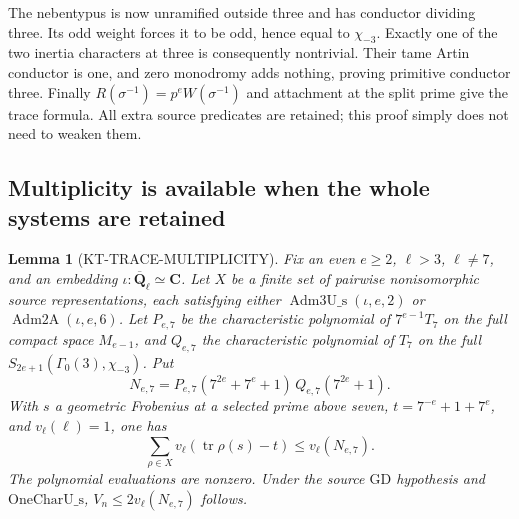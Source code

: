 \documentclass[11pt,a4paper]{article}
\newtheorem{lemma}[theorem]{Lemma}
\theoremstyle{definition}
\begin{document}
The nebentypus is now unramified outside three and has conductor
dividing three. Its odd weight forces it to be odd, hence equal
to $\chi_{-3}$. Exactly one of the two inertia characters at
three is consequently nontrivial. Their tame Artin conductor
is one, and zero monodromy adds nothing, proving primitive
conductor three. Finally
$R(\sigma^{-1})=p^eW(\sigma^{-1})$ and attachment at the split
prime give the trace formula. All extra source predicates are
retained; this proof simply does not need to weaken them.

\subsection{Multiplicity is available when the whole systems are retained}

\begin{lemma}[KT-TRACE-MULTIPLICITY]
Fix an even $e\geq2$, $\ell>3$, $\ell\ne7$, and an embedding
$\iota:\overline{\mathbf Q}_\ell\simeq\mathbf C$.
Let $X$ be a finite set of pairwise nonisomorphic source
representations, each satisfying either
$\operatorname{Adm3U\_s}(\iota,e,2)$ or
$\operatorname{Adm2A}(\iota,e,6)$.
Let $P_{e,7}$ be the characteristic polynomial of
$7^{e-1}T_7$ on the full compact space $M_{e-1}$, and
$Q_{e,7}$ the characteristic polynomial of $T_7$ on the full
$S_{2e+1}(\Gamma_0(3),\chi_{-3})$.
Put
\[
 N_{e,7}=P_{e,7}(7^{2e}+7^e+1)\,Q_{e,7}(7^{2e}+1).
\]
With $s$ a geometric Frobenius at a selected prime above seven,
$t=7^{-e}+1+7^e$, and $v_\ell(\ell)=1$, one has
\[
 \sum_{\rho\in X}v_\ell(\operatorname{tr}\rho(s)-t)
                       \leq v_\ell(N_{e,7}).           \tag{KT-M.1}
\]
The polynomial evaluations are nonzero. Under the source
$\mathrm{GD}$ hypothesis and $\mathrm{OneCharU\_s}$,
$V_n\leq2v_\ell(N_{e,7})$ follows.
\end{lemma}
\end{document}
